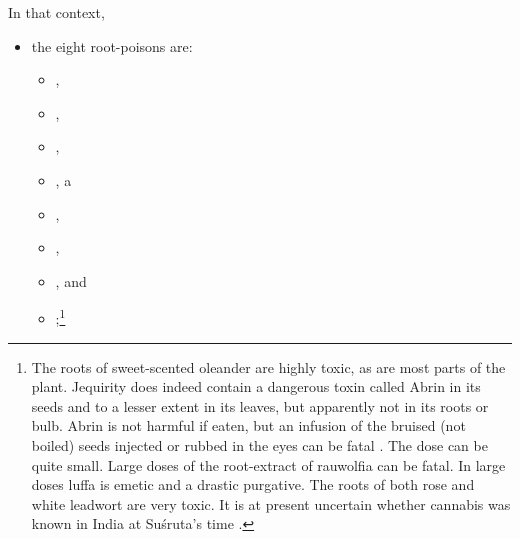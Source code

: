 \begin{translation}
    In that context,\label{poisonousplants}
    \begin{itemize}
        \item
        the eight root-poisons are:
        \begin{itemize}
        \item {},
        \item {},
        \item {},
        \item {},
        a
        \item {},
        \item {},
        \item {},
        and
        \item {};\footnote{The roots of sweet-scented oleander are highly toxic, as
        are most parts of the plant.  Jequirity does indeed contain a dangerous
        toxin called Abrin in its seeds and to a lesser extent in its leaves,
        but apparently not in its roots or bulb.  Abrin is not harmful if eaten,
        but an infusion of the bruised (not boiled) seeds injected or rubbed in
        the eyes can be fatal \citep[no.\,6]{NK}.  The dose can be quite small.
        Large doses of the root-extract of rauwolfia can be fatal. In
        large doses luffa is emetic and a drastic purgative. The roots of both
        rose and white leadwort are very toxic.  It is at present
        uncertain whether cannabis was known in India at
        Suśruta's time \citep{meul-sear}.}
        \end{itemize}
        \end{itemize}
    

\end{translation}
